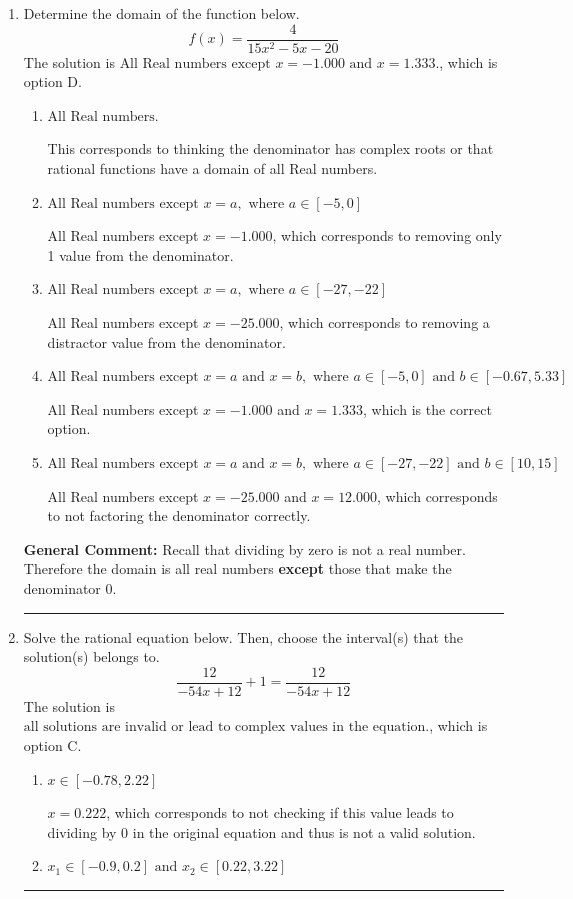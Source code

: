 \documentclass{extbook}[14pt]
\newcommand{\litem}[1]{\item #1

\rule{\textwidth}{0.4pt}}
\begin{document}
\begin{enumerate}\litem{
Determine the domain of the function below.
\[ f(x) = \frac{4}{15x^{2} -5 x -20} \]The solution is \( \text{All Real numbers except } x = -1.000 \text{ and } x = 1.333. \), which is option D.\begin{enumerate}[label=\Alph*.]
\item \( \text{All Real numbers.} \)

This corresponds to thinking the denominator has complex roots or that rational functions have a domain of all Real numbers.
\item \( \text{All Real numbers except } x = a, \text{ where } a \in [-5, 0] \)

All Real numbers except $x = -1.000$, which corresponds to removing only 1 value from the denominator.
\item \( \text{All Real numbers except } x = a, \text{ where } a \in [-27, -22] \)

All Real numbers except $x = -25.000$, which corresponds to removing a distractor value from the denominator.
\item \( \text{All Real numbers except } x = a \text{ and } x = b, \text{ where } a \in [-5, 0] \text{ and } b \in [-0.67, 5.33] \)

All Real numbers except $x = -1.000$ and $x = 1.333$, which is the correct option.
\item \( \text{All Real numbers except } x = a \text{ and } x = b, \text{ where } a \in [-27, -22] \text{ and } b \in [10, 15] \)

All Real numbers except $x = -25.000$ and $x = 12.000$, which corresponds to not factoring the denominator correctly.
\end{enumerate}

\textbf{General Comment:} Recall that dividing by zero is not a real number. Therefore the domain is all real numbers \textbf{except} those that make the denominator 0.
}
\litem{
Solve the rational equation below. Then, choose the interval(s) that the solution(s) belongs to.
\[ \frac{12}{-54x + 12} + 1 = \frac{12}{-54x + 12} \]The solution is \( \text{all solutions are invalid or lead to complex values in the equation.} \), which is option C.\begin{enumerate}[label=\Alph*.]
\item \( x \in [-0.78,2.22] \)

$x = 0.222$, which corresponds to not checking if this value leads to dividing by 0 in the original equation and thus is not a valid solution.
\item \( x_1 \in [-0.9, 0.2] \text{ and } x_2 \in [0.22,3.22] \)


\end{enumerate}}
\end{enumerate}
\end{document}

